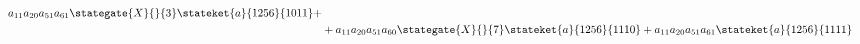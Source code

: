 \begin{align*}
  a_{11}a_{20}a_{51}a_{61} \stategate{X}{}{3}\stateket{a}{1256}{1011}+                                                                                                                                                                                                                                            \\
             & +a_{11}a_{20}a_{51}a_{60} \stategate{X}{}{7}\stateket{a}{1256}{1110}+
  a_{11}a_{20}a_{51}a_{61} \stateket{a}{1256}{1111}                                                                                                                                                                                                                                                               \\
\end{align*}

